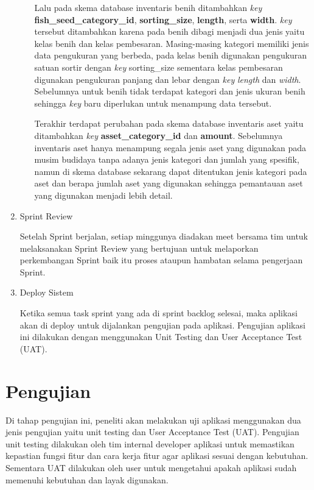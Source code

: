 \begin{enumerate}
\begin{enumerate}
		Lalu pada skema database inventaris benih ditambahkan \textit{key} \textbf{fish\_seed\_category\_id}, \textbf{sorting\_size}, \textbf{length}, serta \textbf{width}. \textit{key} tersebut ditambahkan karena pada benih dibagi menjadi dua jenis yaitu kelas benih dan kelas pembesaran. Masing-masing kategori memiliki jenis data pengukuran yang berbeda, pada kelas benih digunakan pengukuran satuan sortir dengan \textit{key} sorting\_size sementara kelas pembesaran digunakan pengukuran panjang dan lebar dengan \textit{key} \textit{length} dan \textit{width}. Sebelumnya untuk benih tidak terdapat kategori dan jenis ukuran benih sehingga \textit{key} baru diperlukan untuk menampung data tersebut.

		Terakhir terdapat perubahan pada skema database inventaris aset yaitu ditambahkan \textit{key} \textbf{asset\_category\_id} dan \textbf{amount}. Sebelumnya inventaris aset hanya menampung segala jenis aset yang digunakan pada musim budidaya tanpa adanya jenis kategori dan jumlah yang spesifik, namun di skema database sekarang dapat ditentukan jenis kategori pada aset dan berapa jumlah aset yang digunakan sehingga pemantauan aset yang digunakan menjadi lebih detail.

	\end{enumerate}
	
	\item Sprint Review
	
	Setelah Sprint berjalan, setiap minggunya diadakan meet bersama tim untuk melaksanakan Sprint Review yang bertujuan untuk melaporkan perkembangan Sprint baik itu proses ataupun hambatan selama pengerjaan Sprint.
	
	\item Deploy Sistem
	
	Ketika semua task sprint yang ada di sprint backlog selesai, maka aplikasi akan di deploy untuk dijalankan pengujian pada aplikasi. Pengujian aplikasi ini dilakukan dengan menggunakan Unit Testing dan User Acceptance Test (UAT).
	
\end{enumerate}

\section{Pengujian}

Di tahap pengujian ini, peneliti akan melakukan uji aplikasi menggunakan dua jenis pengujian yaitu unit testing dan User Acceptance Test (UAT). Pengujian unit testing dilakukan oleh tim internal developer aplikasi untuk memastikan kepastian fungsi fitur dan cara kerja fitur agar aplikasi sesuai dengan kebutuhan. Sementara UAT dilakukan oleh user untuk mengetahui apakah aplikasi sudah memenuhi kebutuhan dan layak digunakan.

